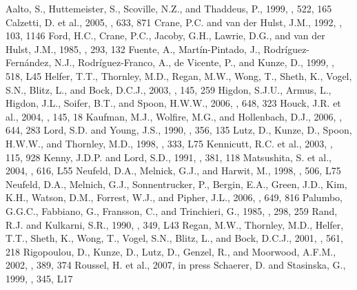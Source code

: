 \documentclass[manuscript]{aastex}
\begin{document}
\begin{thebibliography}{}
 Aalto, S., Huttemeister, S., Scoville, N.Z., and Thaddeus, P., 1999, \aj, 522, 165
 Calzetti, D. et al., 2005, \apj, 633, 871
 Crane, P.C. and van der Hulst, J.M., 1992, \aj, 103, 1146
 Ford, H.C., Crane, P.C., Jacoby, G.H., Lawrie, D.G., and van der Hulst, J.M., 1985, \apj, 293, 132
 Fuente, A., Mart\'{i}n-Pintado, J., Rodr\'{i}guez-Fern\'{a}ndez, N.J., Rodr\'{i}guez-Franco, A., de Vicente, P., and Kunze, D., 1999, \apj, 518, L45 
 Helfer, T.T., Thornley, M.D., Regan, M.W., Wong, T., Sheth, K., Vogel, S.N., Blitz, L., and Bock, D.C.J., 2003, \apjs, 145, 259
 Higdon, S.J.U., Armus, L., Higdon, J.L., Soifer, B.T., and Spoon, H.W.W., 2006, \apj, 648, 323
 Houck, J.R. et al., 2004, \apjs, 145, 18
 Kaufman, M.J., Wolfire, M.G., and Hollenbach, D.J., 2006, \apj, 644, 283 
 Lord, S.D. and Young, J.S., 1990, \apj, 356, 135
 Lutz, D., Kunze, D., Spoon, H.W.W., and Thornley, M.D., 1998, \aap, 333, L75
 Kennicutt, R.C. et al., 2003, \pasp, 115, 928
 Kenny, J.D.P. and Lord, S.D., 1991, \apj, 381, 118
 Matsushita, S. et al., 2004, \apj, 616, L55
 Neufeld, D.A., Melnick, G.J., and Harwit, M., 1998, \apj, 506, L75
 Neufeld, D.A., Melnich, G.J., Sonnentrucker, P., Bergin, E.A., Green, J.D., Kim, K.H., Watson, D.M., Forrest, W.J., and Pipher, J.L., 2006, \apj, 649, 816 
 Palumbo, G.G.C., Fabbiano, G., Fransson, C., and Trinchieri, G., 1985, \apj, 298, 259 
 Rand, R.J. and Kulkarni, S.R., 1990, \apj, 349, L43
 Regan, M.W., Thornley, M.D., Helfer, T.T., Sheth, K., Wong, T., Vogel, S.N., Blitz, L., and Bock, D.C.J., 2001, \apj, 561, 218
 Rigopoulou, D., Kunze, D., Lutz, D., Genzel, R., and Moorwood, A.F.M., 2002, \aap, 389, 374
 Roussel, H. et al., 2007, in press
 Schaerer, D. and Stasinska, G., 1999, \aap, 345, L17

\end{thebibliography}
\end{document}
